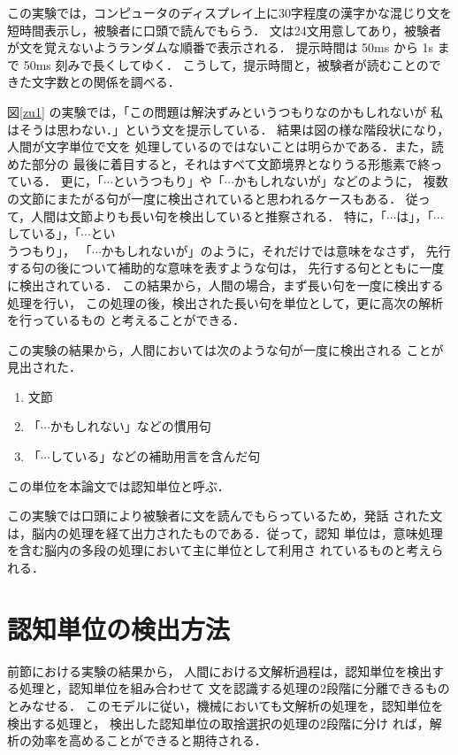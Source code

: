この実験では，コンピュータのディスプレイ上に30字程度の漢字かな混じり文を
短時間表示し，被験者に口頭で読んでもらう．
文は24文用意してあり，被験者が文を覚えないようランダムな順番で表示される．
提示時間は 50ms から 1s まで 50ms 刻みで長くしてゆく．
こうして，提示時間と，被験者が読むことのできた文字数との関係を調べる．

図\ref{zu1} の実験では，「この問題は解決ずみというつもりなのかもしれないが
私はそうは思わない．」という文を提示している．
結果は図の様な階段状になり，人間が文字単位で文を
処理しているのではないことは明らかである．また，読めた部分の
最後に着目すると，それはすべて文節境界となりうる形態素で終っている．
更に，「$\cdots$というつもり」や「$\cdots$かもしれないが」などのように，
複数の文節にまたがる句が一度に検出されていると思われるケースもある．
従って，人間は文節よりも長い句を検出していると推察される．
特に，「$\cdots$は」，「$\cdots$している」，「$\cdots$とい\\うつもり」，
「$\cdots$かもしれないが」のように，それだけでは意味をなさず，
先行する句の後について補助的な意味を表すような句は，
先行する句とともに一度に検出されている．
この結果から，人間の場合，まず長い句を一度に検出する処理を行い，
この処理の後，検出された長い句を単位として，更に高次の解析を行っているもの
と考えることができる．

この実験の結果から，人間においては次のような句が一度に検出される
ことが見出された．

\begin{enumerate}
\item 文節
\item 「$\cdots$かもしれない」などの慣用句
\item 「$\cdots$している」などの補助用言を含んだ句
\end{enumerate}

この単位を本論文では認知単位と呼ぶ．

この実験では口頭により被験者に文を読んでもらっているため，発話
された文は，脳内の処理を経て出力されたものである．従って，認知
単位は，意味処理を含む脳内の多段の処理において主に単位として利用さ
れているものと考えられる．

\section{認知単位の検出方法}

前節における実験の結果から，
人間における文解析過程は，認知単位を検出する処理と，認知単位を組み合わせて
文を認識する処理の2段階に分離できるものとみなせる．
このモデルに従い，機械においても文解析の処理を，認知単位を検出する処理と，
検出した認知単位の取捨選択の処理の2段階に分け
れば，解析の効率を高めることができると期待される．



